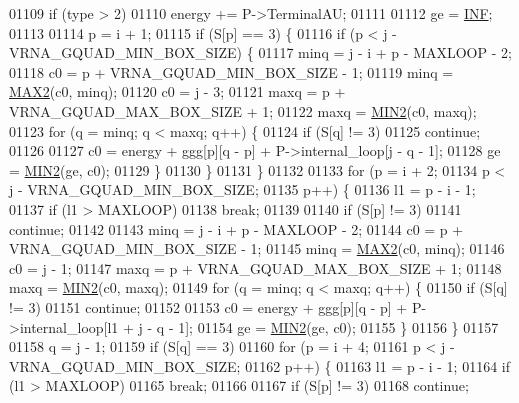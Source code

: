 \begin{DoxyCode}
01109   \textcolor{keywordflow}{if} (type > 2)
01110     energy += P->TerminalAU;
01111 
01112   ge = \hyperlink{energy__const_8h_a12c2040f25d8e3a7b9e1c2024c618cb6}{INF};
01113 
01114   p = i + 1;
01115   \textcolor{keywordflow}{if} (S[p] == 3) \{
01116     \textcolor{keywordflow}{if} (p < j - VRNA\_GQUAD\_MIN\_BOX\_SIZE) \{
01117       minq  = j - i + p - MAXLOOP - 2;
01118       c0    = p + VRNA\_GQUAD\_MIN\_BOX\_SIZE - 1;
01119       minq  = \hyperlink{group__utils_ga33297b3679c713b0c4d897cd0fe3b122}{MAX2}(c0, minq);
01120       c0    = j - 3;
01121       maxq  = p + VRNA\_GQUAD\_MAX\_BOX\_SIZE + 1;
01122       maxq  = \hyperlink{group__utils_gae0b9cd0ce090bd69b951aa73e8fa4f7d}{MIN2}(c0, maxq);
01123       \textcolor{keywordflow}{for} (q = minq; q < maxq; q++) \{
01124         \textcolor{keywordflow}{if} (S[q] != 3)
01125           \textcolor{keywordflow}{continue};
01126 
01127         c0  = energy + ggg[p][q - p] + P->internal\_loop[j - q - 1];
01128         ge  = \hyperlink{group__utils_gae0b9cd0ce090bd69b951aa73e8fa4f7d}{MIN2}(ge, c0);
01129       \}
01130     \}
01131   \}
01132 
01133   \textcolor{keywordflow}{for} (p = i + 2;
01134        p < j - VRNA\_GQUAD\_MIN\_BOX\_SIZE;
01135        p++) \{
01136     l1 = p - i - 1;
01137     \textcolor{keywordflow}{if} (l1 > MAXLOOP)
01138       \textcolor{keywordflow}{break};
01139 
01140     \textcolor{keywordflow}{if} (S[p] != 3)
01141       \textcolor{keywordflow}{continue};
01142 
01143     minq  = j - i + p - MAXLOOP - 2;
01144     c0    = p + VRNA\_GQUAD\_MIN\_BOX\_SIZE - 1;
01145     minq  = \hyperlink{group__utils_ga33297b3679c713b0c4d897cd0fe3b122}{MAX2}(c0, minq);
01146     c0    = j - 1;
01147     maxq  = p + VRNA\_GQUAD\_MAX\_BOX\_SIZE + 1;
01148     maxq  = \hyperlink{group__utils_gae0b9cd0ce090bd69b951aa73e8fa4f7d}{MIN2}(c0, maxq);
01149     \textcolor{keywordflow}{for} (q = minq; q < maxq; q++) \{
01150       \textcolor{keywordflow}{if} (S[q] != 3)
01151         \textcolor{keywordflow}{continue};
01152 
01153       c0  = energy + ggg[p][q - p] + P->internal\_loop[l1 + j - q - 1];
01154       ge  = \hyperlink{group__utils_gae0b9cd0ce090bd69b951aa73e8fa4f7d}{MIN2}(ge, c0);
01155     \}
01156   \}
01157 
01158   q = j - 1;
01159   \textcolor{keywordflow}{if} (S[q] == 3)
01160     \textcolor{keywordflow}{for} (p = i + 4;
01161          p < j - VRNA\_GQUAD\_MIN\_BOX\_SIZE;
01162          p++) \{
01163       l1 = p - i - 1;
01164       \textcolor{keywordflow}{if} (l1 > MAXLOOP)
01165         \textcolor{keywordflow}{break};
01166 
01167       \textcolor{keywordflow}{if} (S[p] != 3)
01168         \textcolor{keywordflow}{continue};

\end{DoxyCode}

